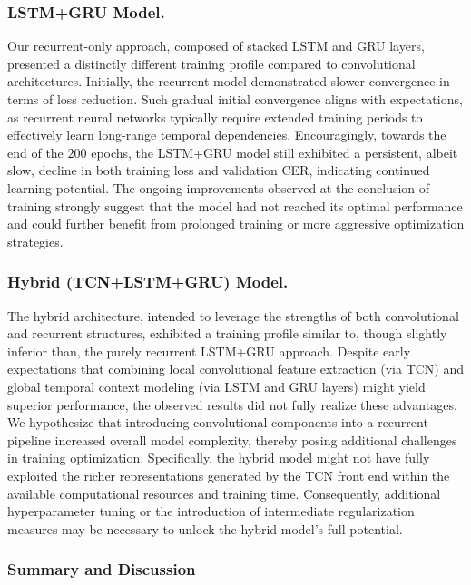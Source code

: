 \subsubsection{LSTM+GRU Model.}

Our recurrent-only approach, composed of stacked LSTM and GRU layers, presented a distinctly different training profile compared to convolutional architectures. Initially, the recurrent model demonstrated slower convergence in terms of loss reduction. Such gradual initial convergence aligns with expectations, as recurrent neural networks typically require extended training periods to effectively learn long-range temporal dependencies. Encouragingly, towards the end of the $200$ epochs, the LSTM+GRU model still exhibited a persistent, albeit slow, decline in both training loss and validation CER, indicating continued learning potential. The ongoing improvements observed at the conclusion of training strongly suggest that the model had not reached its optimal performance and could further benefit from prolonged training or more aggressive optimization strategies.

\subsubsection{Hybrid (TCN+LSTM+GRU) Model.}

The hybrid architecture, intended to leverage the strengths of both convolutional and recurrent structures, exhibited a training profile similar to, though slightly inferior than, the purely recurrent LSTM+GRU approach. Despite early expectations that combining local convolutional feature extraction (via TCN) and global temporal context modeling (via LSTM and GRU layers) might yield superior performance, the observed results did not fully realize these advantages. We hypothesize that introducing convolutional components into a recurrent pipeline increased overall model complexity, thereby posing additional challenges in training optimization. Specifically, the hybrid model might not have fully exploited the richer representations generated by the TCN front end within the available computational resources and training time. Consequently, additional hyperparameter tuning or the introduction of intermediate regularization measures may be necessary to unlock the hybrid model’s full potential.

\subsubsection{Summary and Discussion}

